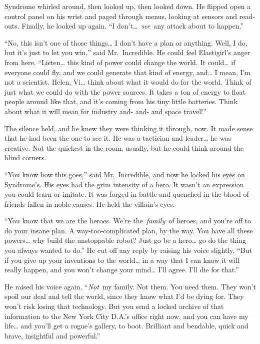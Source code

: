 Syndrome whirled around, then looked up, then looked down. He flipped
open a control panel on his wrist and paged through menus, looking at
sensors and read-outs. Finally, he looked up again. ``I
don't\ldots~\emph{see}~any attack about to happen.''

``No, this isn't one of those things\ldots{} I don't have a plan or
anything. Well, I do, but it's just to let you win,'' said
Mr.~Incredible. He could feel Elastigirl's anger from here.
``Listen\ldots{} this kind of power could change the world. It
could\ldots{} if everyone could fly, and we could generate that kind of
energy, and\ldots{} I mean, I'm not a scientist. Helen, Vi\ldots{} think
about what it would do for the world. Think of just what we could do
with the power sources. It takes a ton of energy to float people around
like that, and it's coming from his tiny little batteries. Think about
what it will mean for industry and- and- and space travel!''

The silence held, and he knew they were thinking it through, now. It
made sense that he had been the one to see it. He was a tactician and
leader\ldots{} he was creative. Not the quickest in the room, usually,
but he could think around the blind corners.

``You know how this goes,'' said Mr.~Incredible, and now he locked his
eyes on Syndrome's. His eyes had the grim intensity of a hero. It wasn't
an expression you could learn or imitate. It was forged in battle and
quenched in the blood of friends fallen in noble causes. He held the
villain's eyes.

``You know that we are the heroes. We're the~\emph{family}~of heroes,
and you're off to do your insane plan. A way-too-complicated plan, by
the way. You have all these powers\ldots{} why build the unstoppable
robot? Just go be a hero\ldots{} go do the thing you always wanted to
do.'' He cut off any reply by raising his voice slightly. ``But if you
give up your inventions to the world\ldots{} in a way that I can know it
will really happen, and you won't change your mind\ldots{} I'll agree.
I'll die for that.''

He raised his voice again. ``\emph{Not}~my family. Not them. You need
them. They won't spoil our deal and tell the world, since they know what
I'd be dying for. They won't risk losing that technology. But you send a
locked archive of that information to the New York City D.A.'s office
right now, and you can have my life\ldots{} and you'll get a rogue's
gallery, to boot. Brilliant and bendable, quick and brave, insightful
and powerful.''

